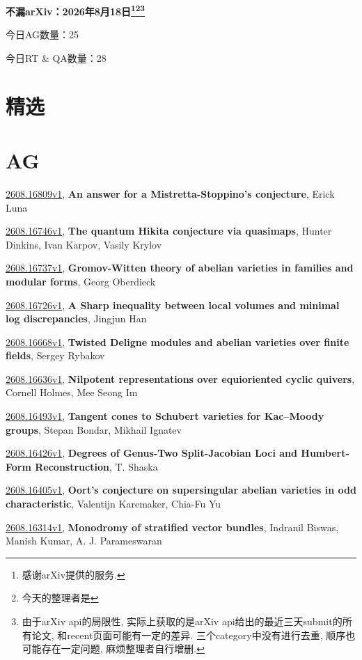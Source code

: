 \documentclass[9pt, a4paper]{article}
\theoremstyle{plain}
\theoremstyle{definition}
\theoremstyle{remark}
\newcommand{\arxiv}[3]{\href{https://arxiv.org/abs/#1}{#1}, \textbf{\textcolor{arxivblue}{#2}}, #3}
\newcommand{\AGnumber}{25}
\newcommand{\RTQAnumber}{28}
\newcommand{\NewestDate}{2026年8月18日}
\newcommand{\todayarXiver}{} %
\begin{document}
\begin{center}
    \Huge\textbf{不漏arXiv：\NewestDate\footnote{感谢arXiv提供的服务.}\footnote{今天的整理者是\todayarXiver}\footnote{由于arXiv api的局限性, 实际上获取的是arXiv api给出的最近三天submit的所有论文, 和recent页面可能有一定的差异. 三个category中没有进行去重, 顺序也可能存在一定问题, 麻烦整理者自行增删.}} \\
\end{center}

\setcounter{section}{-1}

\begin{center}
    今日AG数量：\AGnumber
    
    今日RT \& QA数量：\RTQAnumber
    
\end{center}


\section{精选}


\section{AG}
\arxiv{2608.16809v1}{An answer for a Mistretta-Stoppino's conjecture}{Erick Luna}

\arxiv{2608.16746v1}{The quantum Hikita conjecture via quasimaps}{Hunter Dinkins, Ivan Karpov, Vasily Krylov}

\arxiv{2608.16737v1}{Gromov-Witten theory of abelian varieties in families and modular forms}{Georg Oberdieck}

\arxiv{2608.16726v1}{A Sharp inequality between local volumes and minimal log discrepancies}{Jingjun Han}

\arxiv{2608.16668v1}{Twisted Deligne modules and abelian varieties over finite fields}{Sergey Rybakov}

\arxiv{2608.16636v1}{Nilpotent representations over equioriented cyclic quivers}{Cornell Holmes, Mee Seong Im}

\arxiv{2608.16493v1}{Tangent cones to Schubert varieties for Kac--Moody groups}{Stepan Bondar, Mikhail Ignatev}

\arxiv{2608.16426v1}{Degrees of Genus-Two Split-Jacobian Loci and Humbert-Form Reconstruction}{T. Shaska}

\arxiv{2608.16405v1}{Oort's conjecture on supersingular abelian varieties in odd characteristic}{Valentijn Karemaker, Chia-Fu Yu}

\arxiv{2608.16314v1}{Monodromy of stratified vector bundles}{Indranil Biswas, Manish Kumar, A. J. Parameswaran}
\end{document}
